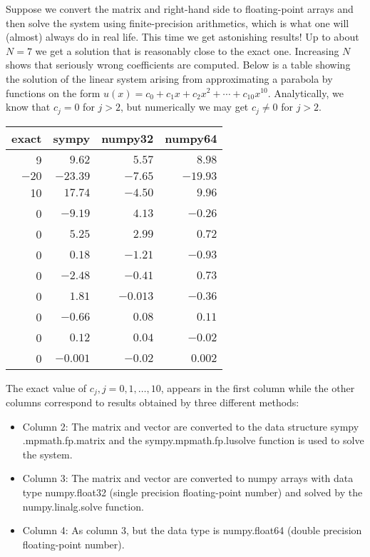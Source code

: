 \documentclass[../main.tex]{subfiles}
\begin{document}
Suppose we convert the matrix and right-hand side to floating-point arrays and then solve the system using finite-precision arithmetics, which is what one will (almost) always do in real life. This time we get astonishing results! Up to about $N=7$ we get a solution that is reasonably close to the exact one. Increasing $N$ shows that seriously wrong coefficients are computed. Below is a table showing the solution of the linear system arising from approximating a parabola by functions on the form $u(x)=c_{0}+c_{1} x+c_{2} x^{2}+\cdots+c_{10} x^{10}$. Analytically, we know that $c_{j}=0$ for $j>2$, but numerically we may get $c_{j} \neq 0$ for $j>2$.

\begin{tabular}{rrrr}
	\hline exact & sympy & numpy32 & numpy64 \\
	\hline 9 & $9.62$ & $5.57$ & $8.98$ \\
	$-20$ & $-23.39$ & $-7.65$ & $-19.93$ \\
	10 & $17.74$ & $-4.50$ & $9.96$ \\
	0 & $-9.19$ & $4.13$ & $-0.26$ \\
	0 & $5.25$ & $2.99$ & $0.72$ \\
	0 & $0.18$ & $-1.21$ & $-0.93$ \\
	0 & $-2.48$ & $-0.41$ & $0.73$ \\
	0 & $1.81$ & $-0.013$ & $-0.36$ \\
	0 & $-0.66$ & $0.08$ & $0.11$ \\
	0 & $0.12$ & $0.04$ & $-0.02$ \\
	0 & $-0.001$ & $-0.02$ & $0.002$ \\
	\hline
\end{tabular}
\bigbreak
\noindent The exact value of $c_{j}, j=0,1, \ldots, 10$, appears in the first column while the other columns correspond to results obtained by three different methods:
\begin{itemize}
	\item Column 2: The matrix and vector are converted to the data structure sympy .mpmath.fp.matrix and the sympy.mpmath.fp.lu\textunderscore solve function is used to solve the system.
	\item Column 3: The matrix and vector are converted to numpy arrays with data type numpy.float32 (single precision floating-point number) and solved by the numpy.linalg.solve function.
	\item Column 4: As column 3, but the data type is numpy.float64 (double precision floating-point number).
\end{itemize}
\end{document}
